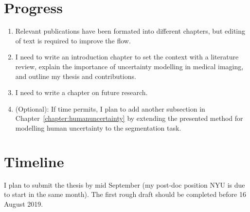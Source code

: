 


\section*{Progress}
\begin{enumerate}
	\item Relevant publications have been formated into different chapters, but editing of text is required to improve the flow. 
	\item I need to write an introduction chapter to set the context with a literature review, explain the importance of uncertainty modelling in medical imaging, and outline my thesis and contributions. 
	\item I need to write a chapter on future research. 
	\item (Optional): If time permits, I plan to add another subsection in Chapter~\ref{chapter:humanuncertainty} by extending the presented method for modelling human uncertainty to the segmentation task.		
\end{enumerate}

\section*{Timeline}
I plan to submit the thesis by mid September (my post-doc position NYU is due to start in the same month). The first rough draft should be completed before 16 August 2019. 

